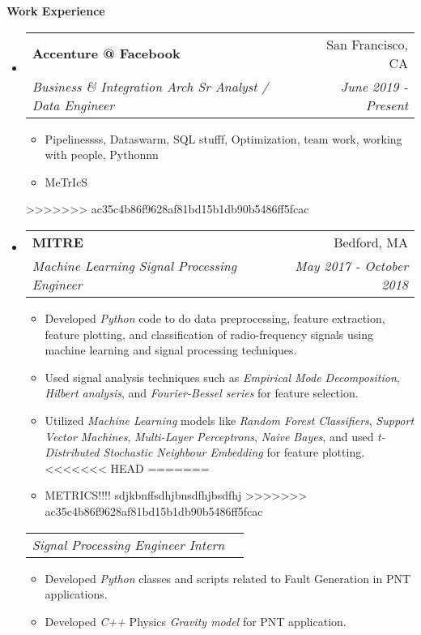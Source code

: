\documentclass[letterpaper, 8pt]{extarticle}
\makeatletter
\newcommand{\resitem}[1]{\item #1 \vspace{-2pt}}
\newcommand{\resheading}[1]{{\large \colorbox{mygrey}{\begin{minipage}{0.99\textwidth}{\textbf{#1 \vphantom{p\^{E}}}}\end{minipage}}}}
\newcommand{\ressubheading}[4]{
\begin{tabular*}{7.40in}{l@{\extracolsep{\fill}}r}
		\textbf{#1} & #2 \\
		\textit{#3} & \textit{#4} \\
\end{tabular*}\vspace{-6pt}}
\newcommand{\rehead}[2]{
\begin{tabular*}{7.40in}{l@{\extracolsep{\fill}}r}
        \textit{#1} & \textit{#2} \\
\end{tabular*}\vspace{-6pt}}
\makeatother
\begin{document}
\resheading{Work Experience}
\begin{itemize}
\setlength{\leftmargini}{0.5em}
<<<<<<< HEAD
=======

\item
    \ressubheading{Accenture @ Facebook}{San Francisco, CA}{Business \& Integration Arch Sr Analyst / Data Engineer}{June 2019 - Present}
    \begin{itemize}
        \resitem{Pipelinessss, Dataswarm, SQL stufff, Optimization, team work, working with people, Pythonnn } 
        \resitem{MeTrIcS} 
    \end{itemize}



>>>>>>> ac35c4b86f9628af81bd15b1db90b5486ff5fcac
\item
	\ressubheading{MITRE}{Bedford, MA}{Machine Learning Signal Processing Engineer}{May 2017 - October 2018}
	\begin{itemize}
		\resitem{Developed \emph{Python} code to do data preprocessing, feature extraction, feature plotting, and classification of radio-frequency signals using machine learning and signal processing techniques.}
        \resitem{Used signal analysis techniques such as \emph{Empirical Mode Decomposition}, \emph{Hilbert analysis}, and \emph{Fourier-Bessel series} for feature selection.}
        \resitem{Utilized \emph{Machine Learning} models like \emph{Random Forest Classifiers}, \emph{Support Vector Machines}, \emph{Multi-Layer Perceptrons}, \emph{Naive Bayes}, and used \emph{t-Distributed Stochastic Neighbour Embedding} for feature plotting.}
<<<<<<< HEAD
=======
        \resitem{METRICS!!!!   sdjkbnffsdhjbnsdfhjbsdfhj}
>>>>>>> ac35c4b86f9628af81bd15b1db90b5486ff5fcac
	\end{itemize}
	\vspace{-3pt}
	\rehead{Signal Processing Engineer Intern}{}
	\begin{itemize}
		\resitem{Developed \emph{Python} classes and scripts related to Fault Generation in PNT applications.}
		\resitem{Developed \emph{C++} Physics \emph{Gravity model} for PNT application.}

\end{itemize}
\end{itemize}
\end{document}
